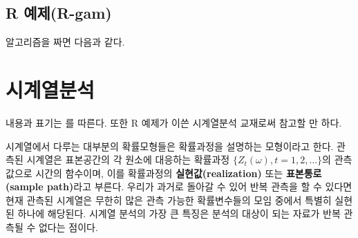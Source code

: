 \documentclass[b5paper,]{scrbook}
\makeatletter
\newenvironment{Shaded}{\begin{snugshade}}{\end{snugshade}}
\newcommand{\KeywordTok}[1]{\textcolor[rgb]{0.13,0.29,0.53}{\textbf{#1}}}
\newcommand{\DataTypeTok}[1]{\textcolor[rgb]{0.13,0.29,0.53}{#1}}
\newcommand{\DecValTok}[1]{\textcolor[rgb]{0.00,0.00,0.81}{#1}}
\newcommand{\FloatTok}[1]{\textcolor[rgb]{0.00,0.00,0.81}{#1}}
\newcommand{\StringTok}[1]{\textcolor[rgb]{0.31,0.60,0.02}{#1}}
\newcommand{\CommentTok}[1]{\textcolor[rgb]{0.56,0.35,0.01}{\textit{#1}}}
\newcommand{\OtherTok}[1]{\textcolor[rgb]{0.56,0.35,0.01}{#1}}
\newcommand{\ControlFlowTok}[1]{\textcolor[rgb]{0.13,0.29,0.53}{\textbf{#1}}}
\newcommand{\OperatorTok}[1]{\textcolor[rgb]{0.81,0.36,0.00}{\textbf{#1}}}
\newcommand{\NormalTok}[1]{#1}
\theoremstyle{plain}
\theoremstyle{definition}
\numberwithin{equation}{section}
\newenvironment{kframe}{%
\medskip{}
\setlength{\fboxsep}{.8em}
 \def\at@end@of@kframe{}%
 \ifinner\ifhmode%
  \def\at@end@of@kframe{\end{minipage}}%
  \begin{minipage}{\columnwidth}%
 \fi\fi%
 \def\FrameCommand##1{\hskip\@totalleftmargin \hskip-\fboxsep
 \colorbox{shadecolor}{##1}\hskip-\fboxsep
     \hskip-\linewidth \hskip-\@totalleftmargin \hskip\columnwidth}%
 \MakeFramed {\advance\hsize-\width
   \@totalleftmargin\z@ \linewidth\hsize
   \@setminipage}}%
 {\par\unskip\endMakeFramed%
 \at@end@of@kframe}
\renewenvironment{Shaded}{\begin{kframe}}{\end{kframe}}
\makeatother
\begin{document}
\section{R 예제(R-gam)}\label{r-r-gam}

알고리즘을 짜면 다음과 같다.

\begin{Shaded}
\end{Shaded}

\chapter{시계열분석}\label{ts}

내용과 표기는 \citep{Shumway2010}를 따른다. \citep{Cryer2008}또한 R
예제가 이쓴 시계열분석 교재로써 참고할 만 하다.

시계열에서 다루는 대부분의 확률모형들은 확률과정을 설명하는 모형이라고
한다. 관측된 시계열은 표본공간의 각 원소에 대응하는 확률과정
\(\{ Z_{t}(\omega), t=1,2,\ldots \}\)의 관측값으로 시간의 함수이며, 이를
확률과정의 \textbf{실현값(realization)} 또는 \textbf{표본통로(sample
path)}라고 부른다. 우리가 과거로 돌아갈 수 있어 반복 관측을 할 수 있다면
현재 관측된 시계열은 무한히 많은 관측 가능한 확률변수들의 모임 중에서
특별히 실현된 하나에 해당된다. 시계열 분석의 가장 큰 특징은 분석의
대상이 되는 자료가 반복 관측될 수 없다는 점이다.
\end{document}
